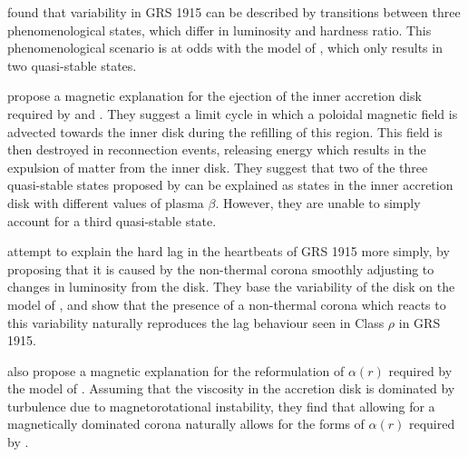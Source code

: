 \par \citealp{Belloni_GRS_MI} found that variability in GRS 1915 can be described by transitions between three phenomenological states, which differ in luminosity and hardness ratio.  This phenomenological scenario is at odds with the model of \citealp{Nayakshin_GRSModel}, which only results in two quasi-stable states.
\par \citealp{Tagger_MagneticFlood} propose a magnetic explanation for the ejection of the inner accretion disk required by \citealp{Nayakshin_GRSModel} and \citealp{Janiuk_RadInstab}.  They suggest a limit cycle in which a poloidal magnetic field is advected towards the inner disk during the refilling of this region.  This field is then destroyed in reconnection events, releasing energy which results in the expulsion of matter from the inner disk.  They suggest that two of the three quasi-stable states proposed by \citealp{Belloni_GRS_MI} can be explained as states in the inner accretion disk with different values of plasma $\beta$.  However, they are unable to simply account for a third quasi-stable state.
\par \citealp{Janiuk_Lag} attempt to explain the hard lag in the heartbeats of GRS 1915 more simply, by proposing that it is caused by the non-thermal corona smoothly adjusting to changes in luminosity from the disk.  They base the variability of the disk on the model of \citealp{Nayakshin_GRSModel}, and show that the presence of a non-thermal corona which reacts to this variability naturally reproduces the lag behaviour seen in Class $\rho$ in GRS 1915.
\par \citealp{Merloni_MagDom} also propose a magnetic explanation for the reformulation of $\alpha(r)$ required by the model of \citealp{Nayakshin_GRSModel}.  Assuming that the viscosity in the accretion disk is dominated by turbulence due to magnetorotational instability, they find that allowing for a magnetically dominated corona naturally allows for the forms of $\alpha(r)$ required by \citealp{Nayakshin_GRSModel}.
